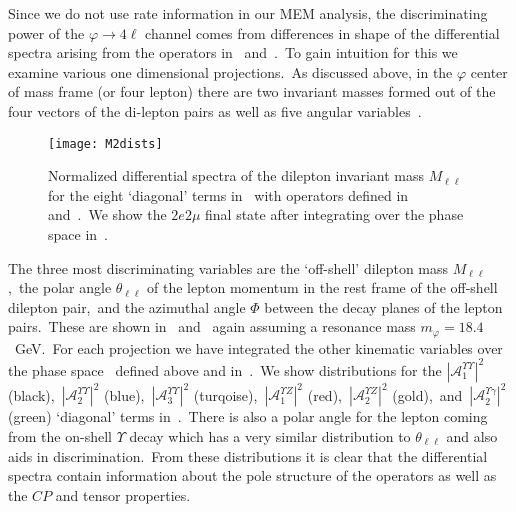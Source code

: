 \documentclass[nofootinbib,twocolumn,prl,preprintnumbers]{revtex4-1}
\begin{document}
Since we do not use rate information in our MEM analysis, the discriminating power of the $\varphi \to 4\ell$ channel comes from differences in shape of the differential spectra arising from the operators in~ and~.~To gain intuition for this we examine various one dimensional projections.~As discussed above, in the $\varphi$ center of mass frame (or four lepton) there are two invariant masses formed out of the four vectors of the di-lepton pairs as well as five angular variables~\cite{Chen:2013ejz}.
\begin{figure}[tbh]
\begin{center}
\texttt{[image: M2dists]}
\caption{Normalized differential spectra of the dilepton invariant mass $M_{\ell\ell}$ for the eight `diagonal' terms in~ with operators defined in~ and~.~We show the $2e2\mu$ final state after integrating over the phase space in~.
}
\label{fig:M2}
\end{center}
\end{figure}

The three most discriminating variables are the `off-shell' dilepton mass $M_{\ell\ell}$,~the polar angle $\theta_{\ell\ell}$ of the lepton momentum in the rest frame of the off-shell dilepton pair,~and the azimuthal angle $\Phi$ between the decay planes of the lepton pairs.~These are shown in~ and~ again assuming a resonance mass $m_{\varphi} = 18.4$~GeV.~For each projection we have integrated the other kinematic variables over the phase space~\cite{Chen:2013ejz} defined above and in~.~We show distributions for the $|\mathcal{A}_{1}^{\Upsilon\Upsilon}|^2$ (black),~$|\mathcal{A}_{2}^{\Upsilon\Upsilon}|^2$ (blue),~$|\mathcal{A}_{3}^{\Upsilon\Upsilon}|^2$ (turqoise),~$|\mathcal{A}_{1}^{\Upsilon Z}|^2$ (red),~$|\mathcal{A}_{2}^{\Upsilon Z}|^2$ (gold),~and~$|\mathcal{A}_{2}^{\Upsilon \gamma}|^2$ (green) `diagonal' terms in~.~There is also a polar angle for the lepton coming from the on-shell $\Upsilon$ decay which has a very similar distribution to $\theta_{\ell\ell}$ and also aids in discrimination.~From these distributions it is clear that the differential spectra contain information about the pole structure of the operators as well as the $CP$ and tensor properties.
\end{document}
